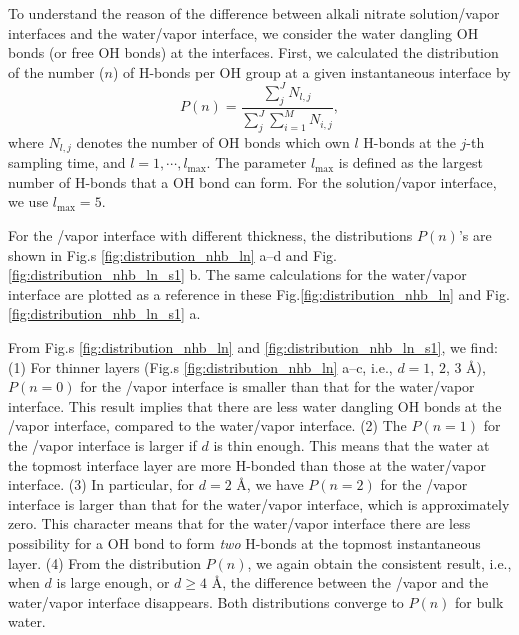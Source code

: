 To understand the reason of the difference between alkali nitrate solution/vapor interfaces and the water/vapor interface,
we consider the water dangling OH bonds (or free OH bonds) at the interfaces. 
First, we calculated the distribution of the number ($n$) of H-bonds per OH group at a given instantaneous interface by
\begin{equation}
P(n) = \frac{\sum_j^J N_{l,j}}{\sum_{j}^J \sum_{i=1}^M N_{i,j}},
\label{eq:Pn_distribution}
\end{equation}
where $N_{l,j}$ denotes the number of OH bonds which own $l$ H-bonds at the $j$-th sampling time, 
and $l=1,\cdots,l_\text{max}$. The parameter $l_\text{max}$ is defined as the largest number of H-bonds that a OH bond can form.
For the solution/vapor interface, we use $l_\text{max}=5$.

For the \LiN/vapor interface with different thickness, the distributions $P(n)$'s are shown in Fig.s \ref{fig:distribution_nhb_ln} a--d 
and Fig.\thinspace\ref{fig:distribution_nhb_ln_s1} b. The same calculations for the water/vapor interface are plotted as a reference in these Fig.\thinspace\ref{fig:distribution_nhb_ln} 
and Fig.\thinspace\ref{fig:distribution_nhb_ln_s1} a.

From Fig.s \ref{fig:distribution_nhb_ln} and \ref{fig:distribution_nhb_ln_s1}, we find:
(1) For thinner layers (Fig.s \ref{fig:distribution_nhb_ln} a--c, i.e., $d=1$, $2$, $3$ \AA), 
$P(n=0)$ for the \LiN/vapor interface is smaller than that for the water/vapor interface.
This result implies that there are less water dangling OH bonds at the \LiN/vapor interface, 
compared to the water/vapor interface.
(2) The $P(n=1)$ for the \LiN/vapor interface is larger if $d$ is thin enough. This means that the water at the topmost interface layer are more H-bonded than those at the 
water/vapor interface.
(3) In particular, for $d=2$ \AA, we have $P(n=2)$ for the \LiN/vapor interface is larger than that for the water/vapor interface, which is approximately zero.
This character means that for the water/vapor interface there are less possibility for a OH bond to form \emph{two} H-bonds at the topmost instantaneous layer. 
(4) From the distribution $P(n)$, we again obtain the consistent result, i.e., when $d$ is large enough, or $d \ge 4$ \AA, 
the difference between the \LiN/vapor and the water/vapor interface disappears.
Both distributions converge to $P(n)$ for bulk water.

